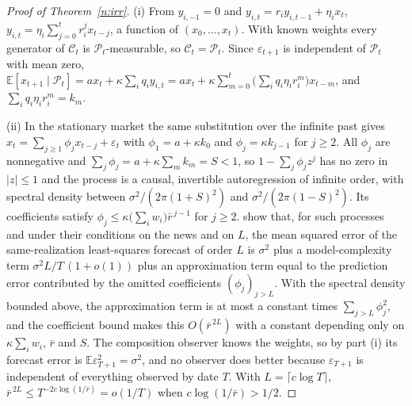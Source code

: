 \begin{proof}[Proof of Theorem~\ref{n:irr}]
(i) From $y_{i,-1}=0$ and $y_{i,t}=r_iy_{i,t-1}+\eta_ix_t$, $y_{i,t}=\eta_i\sum_{j=0}^tr_i^jx_{t-j}$, a function of $(x_0,\ldots,x_t)$. With known weights every generator of $\mathcal C_t$ is $\mathcal P_t$-measurable, so $\mathcal C_t=\mathcal P_t$. Since $\varepsilon_{t+1}$ is independent of $\mathcal P_t$ with mean zero,
$\mathbb E[x_{t+1}\mid\mathcal P_t]=ax_t+\kappa\sum_iq_iy_{i,t}=ax_t+\kappa\sum_{m=0}^t\big(\sum_iq_i\eta_ir_i^m\big)x_{t-m}$, and $\sum_iq_i\eta_ir_i^m=k_m$.

(ii) In the stationary market the same substitution over the infinite past gives $x_t=\sum_{j\ge1}\phi_jx_{t-j}+\varepsilon_t$ with $\phi_1=a+\kappa k_0$ and $\phi_j=\kappa k_{j-1}$ for $j\ge2$. All $\phi_j$ are nonnegative and $\sum_j\phi_j=a+\kappa\sum_mk_m=S<1$, so $1-\sum_j\phi_jz^j$ has no zero in $|z|\le1$ and the process is a causal, invertible autoregression of infinite order, with spectral density between $\sigma^2/(2\pi(1+S)^2)$ and $\sigma^2/(2\pi(1-S)^2)$. Its coefficients satisfy $\phi_j\le\kappa\big(\sum_iw_i\big)\bar r^{\,j-1}$ for $j\ge2$. \citet{ingwei2003} show that, for such processes and under their conditions on the news and on $L$, the mean squared error of the same-realization least-squares forecast of order $L$ is $\sigma^2$ plus a model-complexity term $\sigma^2L/T\,(1+o(1))$ plus an approximation term equal to the prediction error contributed by the omitted coefficients $(\phi_j)_{j>L}$. With the spectral density bounded above, the approximation term is at most a constant times $\sum_{j>L}\phi_j^2$, and the coefficient bound makes this $O(\bar r^{\,2L})$ with a constant depending only on $\kappa\sum_iw_i$, $\bar r$ and $S$. The composition observer knows the weights, so by part (i) its forecast error is $\mathbb E\varepsilon_{T+1}^2=\sigma^2$, and no observer does better because $\varepsilon_{T+1}$ is independent of everything observed by date $T$. With $L=\lceil c\log T\rceil$, $\bar r^{\,2L}\le T^{-2c\log(1/\bar r)}=o(1/T)$ when $c\log(1/\bar r)>1/2$.
\end{proof}

